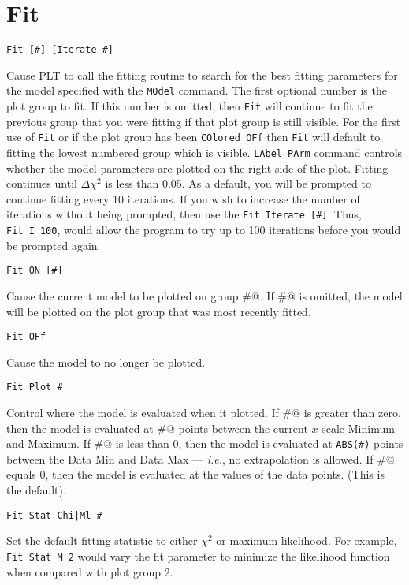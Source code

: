 \section*{Fit}
\begin{verbatim}
Fit [#] [Iterate #]
\end{verbatim}
   Cause PLT to call the fitting routine to search for the best fitting
parameters for the model specified with the {\tt MOdel} command.  The
first optional number is the plot group to fit.  If this number is
omitted, then {\tt Fit} will continue to fit the previous group that you
were fitting if that plot group is still visible.  For the first use of
{\tt Fit}
or if the plot group has been {\tt COlored~OFf} then {\tt Fit} will default
to fitting the lowest numbered group which is visible.  {\tt LAbel~PArm}
command controls whether the model parameters are plotted on the right
side of the plot.  Fitting continues until $\Delta\chi^2$ is less than
0.05.  As a default, you will be prompted to continue fitting every
10 iterations.  If you wish to increase the number of iterations without
being prompted, then use the {\tt Fit~Iterate~[\#]}.  Thus, {\tt Fit~I~100},
would allow the program to try up to 100 iterations before you would
be prompted again.

\medskip
\begin{verbatim}
Fit ON [#]
\end{verbatim}
   Cause the current model to be plotted on group \verb@#@.  If \verb@#@ is omitted,
the model will be plotted on the plot group that was most recently fitted.

\medskip
\begin{verbatim}
Fit OFf
\end{verbatim}
   Cause the model to no longer be plotted.

\medskip
\begin{verbatim}
Fit Plot #
\end{verbatim}
   Control where the model is evaluated when it plotted.  If \verb@#@ is
greater than zero, then the model is evaluated at \verb@#@ points between
the current $x$-scale Minimum and Maximum.  If \verb@#@ is less than 0, then
the model is evaluated at {\tt ABS(\#)} points between the Data Min and Data
Max --- {\it i.e.}, no extrapolation is allowed.  If \verb@#@ equals 0, then the
model is evaluated at the values of the data points. (This is the
default).

\medskip
\begin{verbatim}
Fit Stat Chi|Ml #
\end{verbatim}
   Set the default fitting statistic to either $\chi^2$ or maximum
likelihood.  For example, {\tt Fit~Stat~M~2}  would vary the fit parameter
to minimize the likelihood function when compared with plot group 2.

